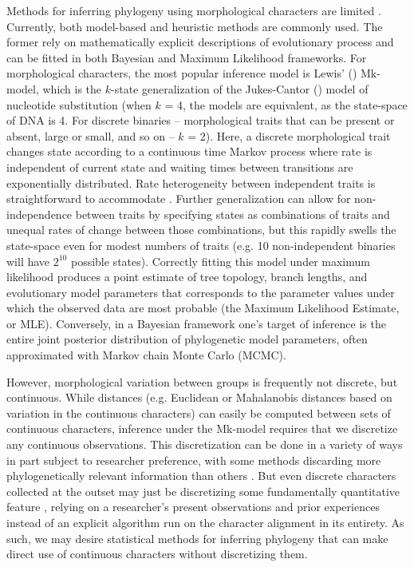 \documentclass[10pt, twocolumn, twoside]{article}
\begin{document}
Methods for inferring phylogeny using morphological characters are limited \citep{hollandRiseStatisticalPhylogenetics2013, leeMorphologicalPhylogeneticsGenomic2015}. Currently, both model-based and heuristic methods are commonly used. The former rely on mathematically explicit descriptions of evolutionary process and can be fitted in both Bayesian and Maximum Likelihood frameworks. For morphological characters, the most popular inference model is Lewis’ (\citeyear{lewisLikelihoodApproachEstimating2001}) Mk-model, which is the $k$-state generalization of the Jukes-Cantor (\citeyear{jukesEvolutionProteinMolecules1969}) model of nucleotide substitution (when $k$ = 4, the models are equivalent, as the state-space of DNA is 4. For discrete binaries – morphological traits that can be present or absent, large or small, and so on – $k$ = 2). Here, a discrete morphological trait changes state according to a continuous time Markov process where rate is independent of current state and waiting times between transitions are exponentially distributed. Rate heterogeneity between independent traits is straightforward to accommodate \citep{wrightModelingCharacterChange2016}. Further generalization can allow for non-independence between traits by specifying states as combinations of traits and unequal rates of change between those combinations, but this rapidly swells the state-space even for modest numbers of traits (e.g. 10 non-independent binaries will have $2^{10}$ possible states). Correctly fitting this model under maximum likelihood produces a point estimate of tree topology, branch lengths, and evolutionary model parameters that corresponds to the parameter values under which the observed data are most probable (the Maximum Likelihood Estimate, or MLE). Conversely, in a Bayesian framework one's target of inference is the entire joint posterior distribution of phylogenetic model parameters, often approximated with Markov chain Monte Carlo (MCMC).

However, morphological variation between groups is frequently not discrete, but continuous. While distances (e.g. Euclidean or Mahalanobis distances based on variation in the continuous characters) can easily be computed between sets of continuous characters, inference under the Mk-model \citep{lewisLikelihoodApproachEstimating2001} requires that we discretize any continuous observations. This discretization can be done in a variety of ways \citep{garcia-cruzCodingQuantitativeCharacter2006, thorpeCodingMorphometricCharacters1984} in part subject to researcher preference, with some methods discarding more phylogenetically relevant information than others \citep{brazeauProblematicCharacterCoding2011}. But even discrete characters collected at the outset may just be discretizing some fundamentally quantitative feature \citep{wiensCharacterAnalysisMorphological2001}, relying on a researcher’s present observations and prior experiences instead of an explicit algorithm run on the character alignment in its entirety. As such, we may desire statistical methods for inferring phylogeny that can make direct use of continuous characters without discretizing them.
\end{document}
